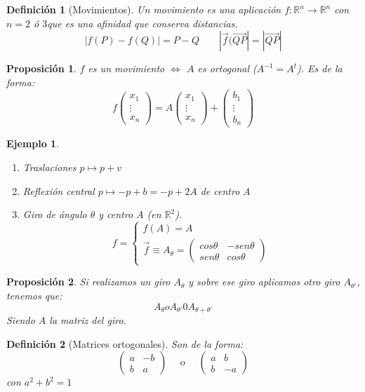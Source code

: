 \documentclass[11pt, a4paper, titlepage]{article}
\newcommand{\R}{\mathbb{R}}
\theoremstyle{theorem-style}
\newtheorem*{nprop}{Proposición}
\theoremstyle{definition-style}
\newtheorem*{ndef}{Definición}
\theoremstyle{remark-style}
\theoremstyle{example-style}
\newtheorem*{ejemplo}{Ejemplo}
\newenvironment{nlist}
{\begin{enumerate}
\renewcommand\labelenumi{(\emph{\roman{enumi})}}}
{\end{enumerate}}
\begin{document}
\begin{ndef}[Movimientos]
	Un movimiento es una aplicación $f:\R^n \to \R^n$ con $n= 2$ ó $3$que es una afinidad que conserva distancias.
	\[
	|f(P)-f(Q)|= P-Q \quad  \quad |\vec{f}(\vec{QP}|= |\vec{QP}|
	\]
\end{ndef}

\begin{nprop}
	$f$ es un movimiento $\iff$ $A$ es ortogonal ($A^{-1}= A^t$). Es de la forma:
	\[
	f \begin{pmatrix}
x_1\\
\vdots\\
x_n 
\end{pmatrix} = A \begin{pmatrix}
x_1\\
\vdots\\
x_n 
\end{pmatrix} + \begin{pmatrix}
b_1\\
\vdots\\
b_n 
\end{pmatrix}
	\]
\end{nprop}


\begin{ejemplo}
	\begin{nlist}
	\item Traslaciones $p \mapsto p+v$
	\item Reflexión central $p \mapsto -p +b= -p +2A$ de centro A
	\item Giro de ángulo $\theta$ y centro $A$ (en $\R^2$).
	\[
	f= \begin{cases}
	f(A) = A \\
	\vec{f} \equiv A_{\theta} = \begin{pmatrix}
 cos \theta & -sen \theta\\
 sen \theta & cos \theta
\end{pmatrix} 
\end{cases}
	\]
\end{nlist}
\end{ejemplo}

\begin{nprop}
	Si realizamos un giro $A_\theta$ y sobre ese giro aplicamos otro giro $A_{\theta'}$, tenemos que:
	\[
	A_{\theta} o A_{\theta'} 0 A_{\theta+\theta'}
	\]
	Siendo $A$ la matriz del giro.
\end{nprop}

\begin{ndef}[Matrices ortogonales]
	Son de la forma:
	\[
	\begin{pmatrix}
 a & -b \\
 b & a 
\end{pmatrix} \quad \text { o } \quad \begin{pmatrix}
 a & b \\
 b & -a 
\end{pmatrix}
	\]
	con $a^2+b^2 = 1$
\end{ndef}
\end{document}

